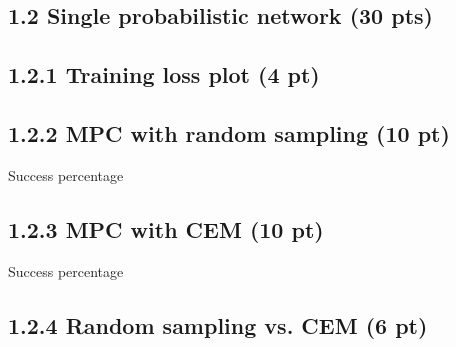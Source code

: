 \documentclass[12pt]{article}
\begin{document}
\begin{tcolorbox}[fit,height=20em, width=40em, blank, borderline={1pt}{1pt},nobeforeafter]
\begin{center}
\end{center}
\end{tcolorbox}


\subsection*{1.2 Single probabilistic network (30 pts)}

\subsection*{1.2.1 Training loss plot (4 pt)}

\begin{tcolorbox}[fit,height=30em, width=40em, blank, borderline={1pt}{1pt},nobeforeafter]
\begin{center}
\end{center}
\end{tcolorbox}

\subsection*{1.2.2 MPC with random sampling (10 pt)}

Success percentage
\begin{tcolorbox}[fit,height=1cm, width=5cm, blank, borderline={1pt}{1pt},nobeforeafter]
\begin{center}
\end{center}
\end{tcolorbox}

\subsection*{1.2.3 MPC with CEM (10 pt)}

Success percentage
\begin{tcolorbox}[fit,height=1cm, width=5cm, blank, borderline={1pt}{1pt},nobeforeafter]
\begin{center}
\end{center}
\end{tcolorbox}

\subsection*{1.2.4 Random sampling vs. CEM  (6 pt)}
\end{document}
